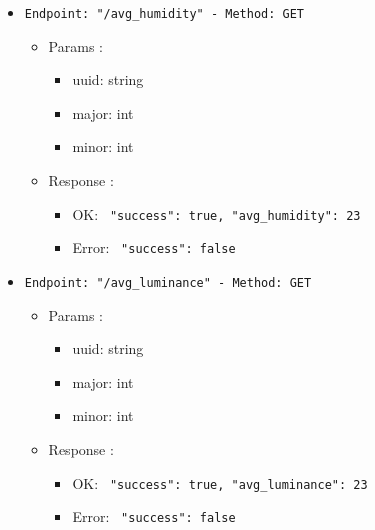 \begin{itemize}
  \item \texttt{Endpoint: "/avg_humidity" -  Method: GET}
  \begin{itemize} 
    \item Params :
    \begin{itemize}
      \item uuid: string
      \item major: int
      \item minor: int
    \end{itemize}

    \item Response : 
    \begin{itemize}
      \item OK: \texttt{{ "success": true, "avg_humidity": 23 }}
      \item Error: \texttt{{ "success": false }}
    \end{itemize}
  \end{itemize}
\end{itemize}

\begin{itemize}
  \item \texttt{Endpoint: "/avg_luminance" -  Method: GET}
  \begin{itemize} 
    \item Params :
    \begin{itemize}
      \item uuid: string
      \item major: int
      \item minor: int
    \end{itemize}

    \item Response : 
    \begin{itemize}
      \item OK: \texttt{{ "success": true, "avg_luminance": 23 }}
      \item Error: \texttt{{ "success": false }}
    \end{itemize}
  \end{itemize}
\end{itemize}




